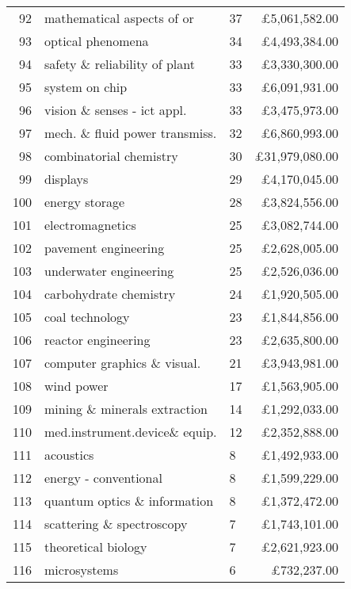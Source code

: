 \begin{spacing}{0.9}
\begin{longtable}[c]{r|>{\raggedleft\arraybackslash}m{6.5cm}|>{\raggedleft\arraybackslash}m{1.9cm}|r}
{92} & {mathematical aspects of or} & {37} & {\pounds5,061,582.00}\\
{93} & {optical phenomena} & {34} & {\pounds4,493,384.00}\\
{94} & {safety \& reliability of plant} & {33} & {\pounds3,330,300.00}\\
{95} & {system on chip} & {33} & {\pounds6,091,931.00}\\
{96} & {vision \& senses - ict appl.} & {33} & {\pounds3,475,973.00}\\
{97} & {mech. \& fluid power transmiss.} & {32} & {\pounds6,860,993.00}\\
{98} & {combinatorial chemistry} & {30} & {\pounds31,979,080.00}\\
{99} & {displays} & {29} & {\pounds4,170,045.00}\\
{100} & {energy storage} & {28} & {\pounds3,824,556.00}\\
{101} & {electromagnetics} & {25} & {\pounds3,082,744.00}\\
{102} & {pavement engineering} & {25} & {\pounds2,628,005.00}\\
{103} & {underwater engineering} & {25} & {\pounds2,526,036.00}\\
{104} & {carbohydrate chemistry} & {24} & {\pounds1,920,505.00}\\
{105} & {coal technology} & {23} & {\pounds1,844,856.00}\\
{106} & {reactor engineering} & {23} & {\pounds2,635,800.00}\\
{107} & {computer graphics \& visual.} & {21} & {\pounds3,943,981.00}\\
{108} & {wind power} & {17} & {\pounds1,563,905.00}\\
{109} & {mining \& minerals extraction} & {14} & {\pounds1,292,033.00}\\
{110} & {med.instrument.device\& equip.} & {12} & {\pounds2,352,888.00}\\
{111} & {acoustics} & {8} & {\pounds1,492,933.00}\\
{112} & {energy - conventional} & {8} & {\pounds1,599,229.00}\\
{113} & {quantum optics \& information} & {8} & {\pounds1,372,472.00}\\
{114} & {scattering \& spectroscopy} & {7} & {\pounds1,743,101.00}\\
{115} & {theoretical biology} & {7} & {\pounds2,621,923.00}\\
{116} & {microsystems} & {6} & {\pounds732,237.00}\\

\end{longtable}
\end{spacing}
